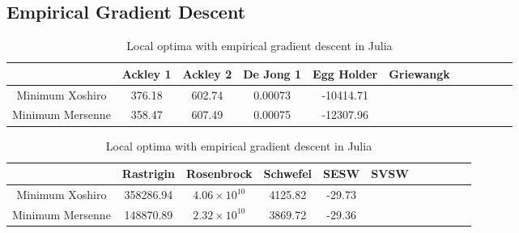 \documentclass{article}
\begin{document}
        \subsection{Empirical Gradient Descent}

            \begin{table}[h]
                \begin{centering}
                    \begin{tabular}{|c|c|c|c|c|c|c|c|c|c|c|}
                        \hline
                                        & Ackley 1 & Ackley 2 & De Jong 1 & Egg Holder & Griewangk \\
                        \hline
                        \hline
                        Minimum Xoshiro & 376.18  & 602.74   & 0.00073   & -10414.71  &           \\
                        \hline
                        Minimum Mersenne& 358.47  & 607.49   & 0.00075   & -12307.96  &           \\
                        \hline
                    \end{tabular}
                    \caption{Local optima with empirical gradient descent in Julia}
            \end{centering}
            \end{table}

            \begin{table}[h]
                \begin{centering}
                    \begin{tabular}{|c|c|c|c|c|c|c|c|c|c|c|}
                        \hline
                                        & Rastrigin & Rosenbrock            & Schwefel & SESW   & SVSW \\
                        \hline
                        \hline
                        Minimum Xoshiro & 358286.94 & $4.06 \times 10^{10}$ & 4125.82  & -29.73 &      \\
                        \hline
                        Minimum Mersenne& 148870.89 & $2.32 \times 10^{10}$ & 3869.72  & -29.36 &      \\
                        \hline
                    \end{tabular}
                    \caption{Local optima with empirical gradient descent in Julia}
            \end{centering}
            \end{table}
\pagebreak
\end{document}
